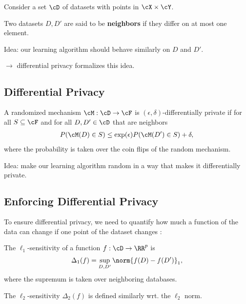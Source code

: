 \documentclass[notheorems]{beamer}
\begin{document}
\begin{frame}
  Consider a set $\cD$ of datasets with points in $\cX \times \cY$.

  \vspace{1em}

  Two datasets $D, D'$ are said to be \textbf{neighbors} if they differ on at most one element.

  \vspace{2em}

  Idea: our learning algorithm should behave similarly on $D$ and $D'$.

  \quad $\rightarrow$ differential privacy formalizes this idea.
\end{frame}

\subsection{Differential Privacy}

\begin{frame}
  \begin{definition}
    A randomized mechanism $\cM: \cD \rightarrow \cF$ is $(\epsilon, \delta)$-differentially private if for all $S \subseteq \cF$ and for all $D, D' \in \cD$ that are neighbors
    \begin{align}
      P(\cM(D) \in S) \le \exp(\epsilon) P(\cM(D') \in S) + \delta,
    \end{align}
    where the probability is taken over the coin flips of the random mechanism.
  \end{definition}

  Idea: make our learning algorithm random in a way that makes it differentially private.
\end{frame}


\subsection{Enforcing Differential Privacy}
\label{sub:enforcing_differential_privacy}

\begin{frame}
  To ensure differential privacy, we need to quantify how much a function of the data can change if one point of the dataset changes :
  \begin{definition}
    The $\ell_1$-sensitivity of a function $f: \cD \rightarrow \RR^p$ is
    \begin{align}
      \Delta_1(f) = \sup_{D, D'} \norm{f(D) - f(D')}_1,
    \end{align}
    where the supremum is taken over neighboring databases.
  \end{definition}

  \vspace{1em}

  The $\ell_2$-sensitivity $\Delta_2(f)$ is defined similarly wrt. the $\ell_2$ norm.
\end{frame}
\end{document}

